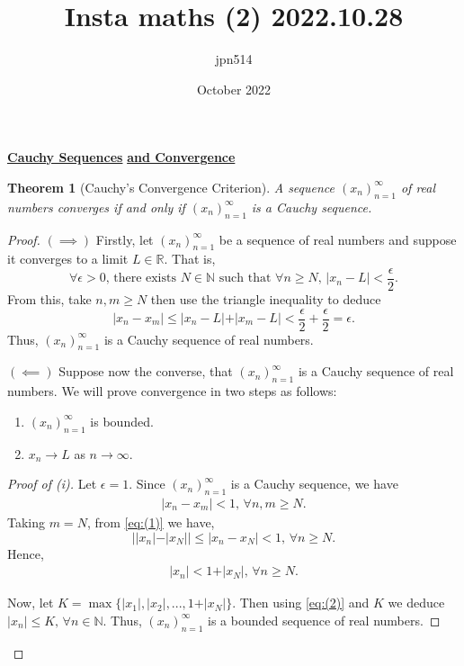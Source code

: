 \documentclass{article}
\title{Insta maths (2) 2022.10.28}
\author{jpn514 }
\date{October 2022}
\newtheorem*{theorem}{Theorem}
\begin{document}
\begin{center}
\huge\underline{\textbf{Cauchy Sequences}}\newline
\huge\underline{\textbf{and Convergence}}\newline
\end{center}

\begin{theorem}[Cauchy's Convergence Criterion]
A sequence $(x_{n})_{n=1}^{\infty}$ of real numbers converges if and only if $(x_{n})_{n=1}^{\infty}$ is a Cauchy sequence.
\end{theorem}
\begin{proof}
$(\implies)$\newline
Firstly, let $(x_{n})_{n=1}^{\infty}$ be a sequence of real numbers and suppose it converges to a limit $L\in\mathbb{R}$. That is,
$$\forall\epsilon>0\text{, there exists }N\in\mathbb{N}\text{ such that }
\forall n\geq N\text{, } \vert{x_{n}-L}\vert<\frac{\epsilon}{2}.$$
From this, take $n,m\geq N$ then use the triangle inequality to deduce 
$$\vert{x_{n}-x_{m}}\vert\leq\vert{x_{n}-L}\vert+\vert{x_{m}-L}\vert<\frac{\epsilon}{2}+\frac{\epsilon}{2}=\epsilon\text{.}$$
Thus, $(x_{n})_{n=1}^{\infty}$ is a Cauchy sequence of real numbers.\newline

$(\impliedby)$
Suppose now the converse, that $(x_{n})_{n=1}^{\infty}$ is a Cauchy sequence of real numbers.
We will prove convergence in two steps as follows:
\begin{enumerate}[label=(\roman*)]
    \item $(x_{n})_{n=1}^{\infty}$ is bounded.
    \item $x_n\to L$ as $n\to\infty$.
\end{enumerate}

\begin{proof}[Proof of (i)]
Let $\epsilon=1$. Since $(x_{n})_{n=1}^{\infty}$ is a Cauchy sequence, we have 
\begin{align}
\vert x_{n}-x_{m}\vert<1\text{, } \forall n,m\geq N\text{.}\label{eq:(1)}\tag{1}
\end{align}
Taking $m=N$, from \eqref{eq:(1)} we have,
$$\big\vert \vert x_{n}\vert -\vert x_{N}\vert \big\vert \leq \vert x_{n}-x_{N}\vert <1 \text{, }\forall n\geq N\text{.}$$
Hence, 
\begin{align}
\vert x_{n}\vert < 1 + \vert x_{N}\vert \text{, } \forall n\geq N\text{.}\label{eq:(2)}\tag{2}
\end{align}

Now, let $K=\max\{\vert x_{1} \vert, \vert x_{2} \vert, ..., 1+\vert x_{N} \vert\}$. Then using \eqref{eq:(2)} and $K$ we deduce $\vert x_{n} \vert\leq K\text{, } \forall n\in\mathbb{N}$. Thus, $(x_{n})_{n=1}^{\infty}$ is a bounded sequence of real numbers.
\end{proof}


\end{proof}
\end{document}
